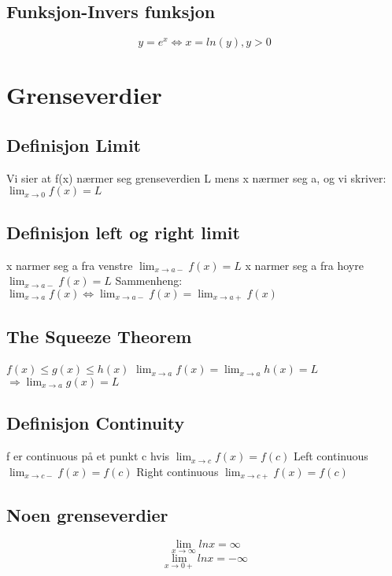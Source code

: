 \documentclass[12pt]{article}
\begin{document}
\subsection*{Funksjon-Invers funksjon}
\[y=e^{x}\Leftrightarrow x=ln(y), y>0\]
\[\]


\newpage\section{Grenseverdier}
\subsection*{Definisjon Limit}
Vi sier at f(x) nærmer seg grenseverdien L mens x nærmer seg a, og vi skriver:
\newline$\lim_{x\to0} f(x) = L$
\subsection*{Definisjon left og right limit}
x narmer seg a fra venstre
\newline$\lim_{x\to a-} f(x) = L$
\newline x narmer seg a fra hoyre
\newline$\lim_{x\to a-} f(x) = L$
\newline Sammenheng:
\newline$\lim_{x\to a} f(x)\iff\lim_{x\to a-} f(x) = \lim_{x\to a+} f(x)$
\subsection*{The Squeeze Theorem}
$f(x)\leq g(x)\leq h(x)$
\newline$\lim_{x\to a} f(x) = \lim_{x\to a} h(x) = L$
\newline$\Rightarrow\lim_{x\to a} g(x) = L$
\subsection*{Definisjon Continuity}
f er continuous på et punkt c hvis
\newline$\lim_{x\to c}f(x) = f(c)$
\newline Left continuous
\newline$\lim_{x\to c-}f(x) = f(c)$
\newline Right continuous
\newline$\lim_{x\to c+}f(x) = f(c)$
\subsection*{Noen grenseverdier}
\[\lim_{x\to\infty}ln x=\infty \]
\[\lim_{x\to0+}ln x=-\infty\]
\end{document}
